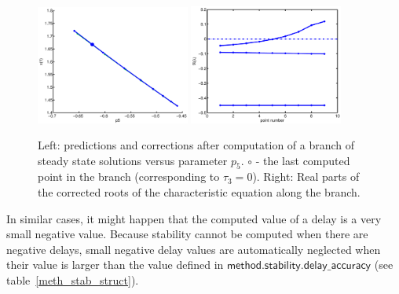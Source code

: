 \documentclass[10pt]{scrartcl}
\newcommand{\parm}[1]{\mathsf{#1}}
\begin{document}
\begin{figure}[h]
\begin{center}
\includegraphics[width=0.45\textwidth]{fig/sdd1}
\includegraphics[width=0.45\textwidth]{fig/sdd2}
\end{center}
\caption{\label{br_stst} Left: predictions and corrections
after computation of a branch of steady state solutions versus
parameter $p_5$. $\circ$ - the last computed point in the branch
(corresponding to $\tau_3=0$). Right: Real parts of the corrected roots 
of the characteristic equation along the branch.}
\end{figure}
In similar cases, it might happen that the computed value of a delay is 
a very small negative value. 
Because stability cannot be computed when there are negative delays, 
small negative delay values are automatically neglected
when their value is larger than the value defined in
$\parm{method.stability.delay\_accuracy}$ (see table~\ref{meth_stab_struct}).
\end{document}
